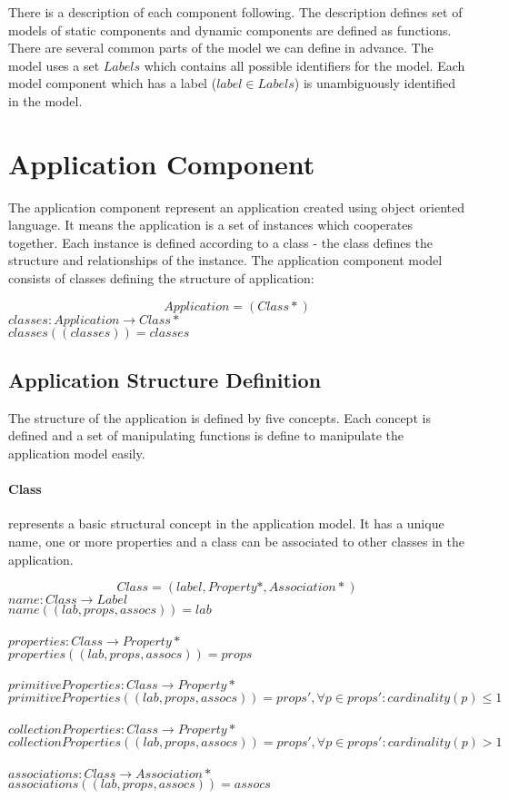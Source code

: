 \documentclass[11pt]{article}
\begin{document}
There is a description of each component following. The description defines set of models of static components and dynamic components are defined as functions. There are several common parts of the model we can define in advance. The model uses a set $Labels$ which contains all possible identifiers for the model. Each model component which has a label ($label \in Labels$) is unambiguously identified in the model.


\section{Application Component}
The application component represent an application created using object oriented language. It means the application is a set of instances which cooperates together. Each instance is defined according to a class - the class defines the structure and relationships of the instance. 
The application component model consists of  classes defining the structure of application:
 
$$
Application = (Class*)
$$
$classes : Application \rightarrow Class*$ \\
$classes((classes)) = classes$



\subsection{Application Structure Definition}
The structure of the application is defined by five concepts. Each concept is defined and a set of manipulating functions is define to manipulate the application model easily.

\paragraph{Class} represents a basic structural concept in the application model. It has a unique name, one or more properties and a class can be associated to other classes in the application. 
	 
$$Class = (label, Property*, Association*)$$
$name : Class \rightarrow Label$ \\
$name((lab, props, assocs)) = lab$ \\ \\
$properties : Class \rightarrow Property*$ \\
$properties((lab, props, assocs)) = props $\\ \\
$primitiveProperties : Class \rightarrow Property*$ \\
$primitiveProperties((lab, props, assocs)) = props', \forall p \in props' : cardinality(p) \leq 1 $\\ \\
$collectionProperties : Class \rightarrow Property*$ \\
$collectionProperties((lab, props, assocs)) = props', \forall p \in props' : cardinality(p) > 1 $\\ \\
$associations : Class \rightarrow Association*$ \\
$associations((lab, props, assocs)) = assocs $
\end{document}
